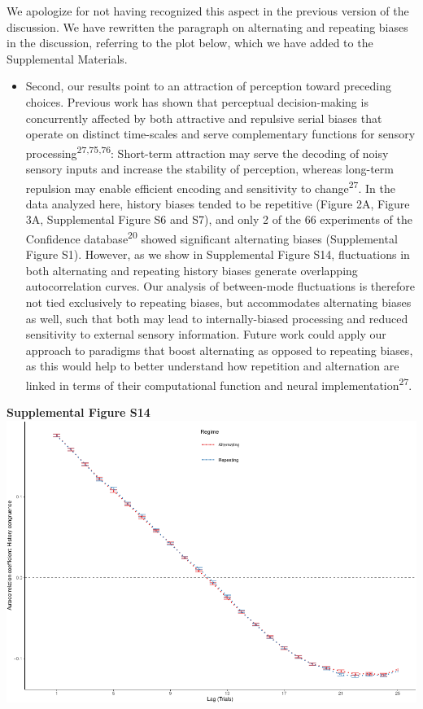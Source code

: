 \documentclass[
]{article}
\providecommand{\tightlist}{%
  \setlength{\itemsep}{0pt}\setlength{\parskip}{0pt}}
\begin{document}
We apologize for not having recognized this aspect in the previous
version of the discussion. We have rewritten the paragraph on
alternating and repeating biases in the discussion, referring to the
plot below, which we have added to the Supplemental Materials.

\begin{itemize}
\tightlist
\item
  Second, our results point to an attraction of perception toward
  preceding choices. Previous work has shown that perceptual
  decision-making is concurrently affected by both attractive and
  repulsive serial biases that operate on distinct time-scales and serve
  complementary functions for sensory
  processing\textsuperscript{27,75,76}: Short-term attraction may serve
  the decoding of noisy sensory inputs and increase the stability of
  perception, whereas long-term repulsion may enable efficient encoding
  and sensitivity to change\textsuperscript{27}. In the data analyzed
  here, history biases tended to be repetitive (Figure 2A, Figure 3A,
  Supplemental Figure S6 and S7), and only 2 of the 66 experiments of
  the Confidence database\textsuperscript{20} showed significant
  alternating biases (Supplemental Figure S1). However, as we show in
  Supplemental Figure S14, fluctuations in both alternating and
  repeating history biases generate overlapping autocorrelation curves.
  Our analysis of between-mode fluctuations is therefore not tied
  exclusively to repeating biases, but accommodates alternating biases
  as well, such that both may lead to internally-biased processing and
  reduced sensitivity to external sensory information. Future work could
  apply our approach to paradigms that boost alternating as opposed to
  repeating biases, as this would help to better understand how
  repetition and alternation are linked in terms of their computational
  function and neural implementation\textsuperscript{27}.
\end{itemize}

\textbf{Supplemental Figure S14}
\includegraphics{modes_mouse_rev1b_clean_files/figure-latex/Supplemental_Figure_S14_print-1.pdf}
\end{document}
